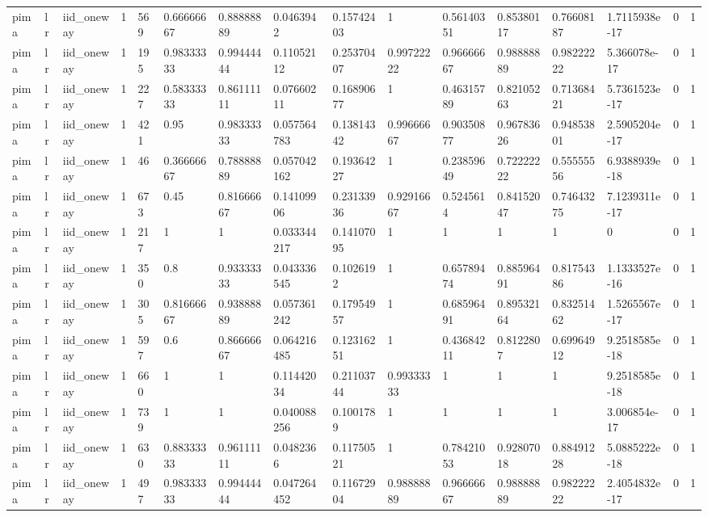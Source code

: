 \begin{tabular}{llllllllllllllll}
pima & lr & iid\_oneway & 1 & 569 & 0.66666667 & 0.88888889 & 0.0463942 & 0.15742403 & 1 & 0.56140351 & 0.85380117 & 0.76608187 & 1.7115938e-17 & 0 & 1 \\
pima & lr & iid\_oneway & 1 & 195 & 0.98333333 & 0.99444444 & 0.11052112 & 0.25370407 & 0.99722222 & 0.96666667 & 0.98888889 & 0.98222222 & 5.366078e-17 & 0 & 1 \\
pima & lr & iid\_oneway & 1 & 227 & 0.58333333 & 0.86111111 & 0.07660211 & 0.16890677 & 1 & 0.46315789 & 0.82105263 & 0.71368421 & 5.7361523e-17 & 0 & 1 \\
pima & lr & iid\_oneway & 1 & 421 & 0.95 & 0.98333333 & 0.057564783 & 0.13814342 & 0.99666667 & 0.90350877 & 0.96783626 & 0.94853801 & 2.5905204e-17 & 0 & 1 \\
pima & lr & iid\_oneway & 1 & 46 & 0.36666667 & 0.78888889 & 0.057042162 & 0.19364227 & 1 & 0.23859649 & 0.72222222 & 0.55555556 & 6.9388939e-18 & 0 & 1 \\
pima & lr & iid\_oneway & 1 & 673 & 0.45 & 0.81666667 & 0.14109906 & 0.23133936 & 0.92916667 & 0.5245614 & 0.84152047 & 0.74643275 & 7.1239311e-17 & 0 & 1 \\
pima & lr & iid\_oneway & 1 & 217 & 1 & 1 & 0.033344217 & 0.14107095 & 1 & 1 & 1 & 1 & 0 & 0 & 1 \\
pima & lr & iid\_oneway & 1 & 350 & 0.8 & 0.93333333 & 0.043336545 & 0.1026192 & 1 & 0.65789474 & 0.88596491 & 0.81754386 & 1.1333527e-16 & 0 & 1 \\
pima & lr & iid\_oneway & 1 & 305 & 0.81666667 & 0.93888889 & 0.057361242 & 0.17954957 & 1 & 0.68596491 & 0.89532164 & 0.83251462 & 1.5265567e-17 & 0 & 1 \\
pima & lr & iid\_oneway & 1 & 597 & 0.6 & 0.86666667 & 0.064216485 & 0.12316251 & 1 & 0.43684211 & 0.8122807 & 0.69964912 & 9.2518585e-18 & 0 & 1 \\
pima & lr & iid\_oneway & 1 & 660 & 1 & 1 & 0.11442034 & 0.21103744 & 0.99333333 & 1 & 1 & 1 & 9.2518585e-18 & 0 & 1 \\
pima & lr & iid\_oneway & 1 & 739 & 1 & 1 & 0.040088256 & 0.1001789 & 1 & 1 & 1 & 1 & 3.006854e-17 & 0 & 1 \\
pima & lr & iid\_oneway & 1 & 630 & 0.88333333 & 0.96111111 & 0.0482366 & 0.11750521 & 1 & 0.78421053 & 0.92807018 & 0.88491228 & 5.0885222e-18 & 0 & 1 \\
pima & lr & iid\_oneway & 1 & 497 & 0.98333333 & 0.99444444 & 0.047264452 & 0.11672904 & 0.98888889 & 0.96666667 & 0.98888889 & 0.98222222 & 2.4054832e-17 & 0 & 1 \\

\end{tabular}
